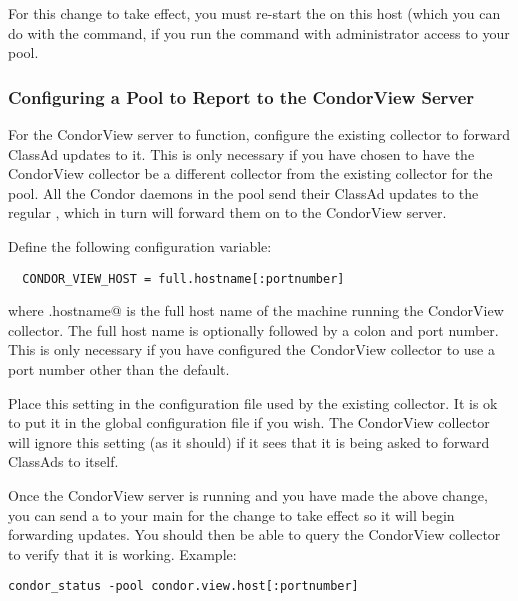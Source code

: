 For this change to take effect, you must re-start the
 on this host (which you can do with the
 command, if you run the command with
administrator access to your pool.


\subsubsection{\label{sec:CondorView-Pool-Setup}
Configuring a Pool to Report to the CondorView Server} 

For the CondorView server to function, configure the existing collector to
forward ClassAd updates to it.  This is only necessary if you have chosen to
have the CondorView collector be a different collector from the existing
collector for the pool.
All the Condor daemons in the pool send their ClassAd updates to the
regular , which in turn will forward them on to the
CondorView server.

Define the following configuration variable:
\begin{verbatim}
  CONDOR_VIEW_HOST = full.hostname[:portnumber]
\end{verbatim}
where \verb@full.hostname@ is the full host name of the machine 
running the CondorView collector.
The full host name is optionally followed by a colon and
port number.  This is only necessary if you have configured the CondorView
collector to use a port number other than the default.

Place this setting in the configuration file used by the existing collector.
It is ok to put it in the global configuration file if you wish.  The
CondorView collector will ignore this setting (as it should) if it sees
that it is being asked to forward ClassAds to itself.

Once the CondorView server is running and you have made the above
change, you can send a
 to your main  for the change to
take effect so it will begin forwarding updates.  You should then be
able to query the CondorView collector to verify that it is working.
Example:

\begin{verbatim}
condor_status -pool condor.view.host[:portnumber]
\end{verbatim}
